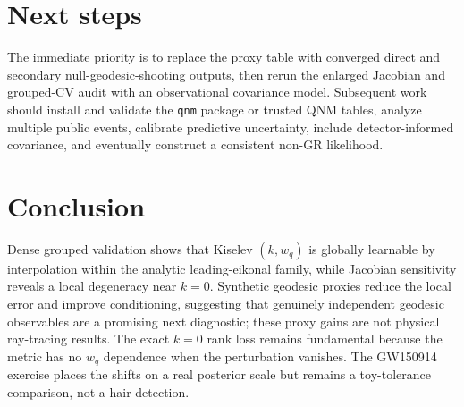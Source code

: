 \documentclass[11pt]{article}
\begin{document}
\section{Next steps}

The immediate priority is to replace the proxy table with converged direct and
secondary null-geodesic-shooting outputs, then rerun the enlarged Jacobian and
grouped-CV audit with an observational covariance model.  Subsequent work should
install and validate the \texttt{qnm} package or trusted QNM tables, analyze multiple
public events, calibrate predictive uncertainty, include detector-informed
covariance, and eventually construct a consistent non-GR likelihood.

\section{Conclusion}

Dense grouped validation shows that Kiselev $(k,w_q)$ is globally learnable by
interpolation within the analytic leading-eikonal family, while Jacobian sensitivity
reveals a local degeneracy near $k=0$.  Synthetic geodesic proxies reduce the local
error and improve conditioning, suggesting that genuinely independent geodesic
observables are a promising next diagnostic; these proxy gains are not physical
ray-tracing results.  The exact $k=0$ rank loss remains fundamental because the
metric has no $w_q$ dependence when the perturbation vanishes.  The GW150914
exercise places the shifts on a real posterior scale but remains a toy-tolerance
comparison, not a hair detection.
\end{document}
